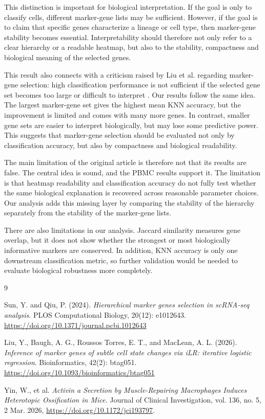 \documentclass[11pt,a4paper]{article}
\begin{document}
This distinction is important for biological interpretation. If the goal is only to classify cells, different marker-gene lists may be sufficient. However, if the goal is to claim that specific genes characterize a lineage or cell type, then marker-gene stability becomes essential. Interpretability should therefore not only refer to a clear hierarchy or a readable heatmap, but also to the stability, compactness and biological meaning of the selected genes.

This result also connects with a criticism raised by Liu et al. regarding marker-gene selection: high classification performance is not sufficient if the selected gene set becomes too large or difficult to interpret \cite{liu2026}. Our results follow the same idea. The largest marker-gene set gives the highest mean KNN accuracy, but the improvement is limited and comes with many more genes. In contrast, smaller gene sets are easier to interpret biologically, but may lose some predictive power. This suggests that marker-gene selection should be evaluated not only by classification accuracy, but also by compactness and biological readability.


The main limitation of the original article is therefore not that its results are false. The central idea is sound, and the PBMC results support it. The limitation is that heatmap readability and classification accuracy do not fully test whether the same biological explanation is recovered across reasonable parameter choices. Our analysis adds this missing layer by comparing the stability of the hierarchy separately from the stability of the marker-gene lists.

There are also limitations in our analysis. Jaccard similarity measures gene overlap, but it does not show whether the strongest or most biologically informative markers are conserved. In addition, KNN accuracy is only one downstream classification metric, so further validation would be needed to evaluate biological robustness more completely.



\begin{thebibliography}{9}

Sun, Y. and Qiu, P. (2024). \textit{Hierarchical marker genes selection in scRNA-seq analysis}. PLOS Computational Biology, 20(12): e1012643. \url{https://doi.org/10.1371/journal.pcbi.1012643}

Liu, Y., Baugh, A. G., Roussos Torres, E. T., and MacLean, A. L. (2026). \textit{Inference of marker genes of subtle cell state changes via iLR: iterative logistic regression}. Bioinformatics, 42(2): btag051. \url{https://doi.org/10.1093/bioinformatics/btag051}

Yin, W., et al. \textit{Activin a Secretion by Muscle-Repairing Macrophages Induces Heterotopic Ossification in Mice.} Journal of Clinical Investigation, vol. 136, no. 5, 2 Mar. 2026, \url{https://doi.org/10.1172/jci193797}.

\end{thebibliography}
\end{document}
